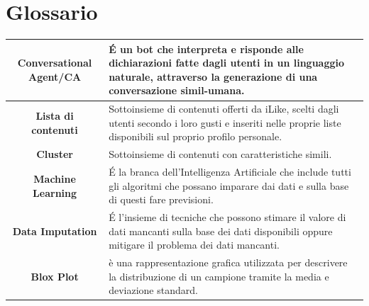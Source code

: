 \documentclass[a4paper, 10pt]{report}
\begin{document}
    \chapter{Glossario}\label{ch:glossario}
        \begin{adjustbox}{width=\columnwidth,center}
            \begin{tabular}{|>{\columncolor{Goldenrod}}c|p{8cm}|}
                \hline \textbf{Conversational Agent/CA} & É un bot che interpreta e risponde alle dichiarazioni fatte dagli utenti
                in un linguaggio naturale, attraverso la  generazione di una conversazione simil-umana.\\
                \hline \textbf{Lista di contenuti} & Sottoinsieme di contenuti offerti da iLike, scelti dagli utenti secondo i loro gusti
                e inseriti nelle proprie liste disponibili sul proprio profilo personale.\\
                \hline \textbf{Cluster} & Sottoinsieme di contenuti con caratteristiche simili.\\
                \hline \textbf{Machine Learning} & É la branca dell'Intelligenza Artificiale che include tutti gli algoritmi
                che possano imparare dai dati e sulla base di questi fare previsioni.\\
                \hline \textbf{Data Imputation} & É l'insieme di tecniche che possono stimare il valore di dati mancanti
                sulla base dei dati disponibili oppure mitigare il problema dei dati mancanti.\\
                \hline \textbf{Blox Plot} & è una rappresentazione grafica utilizzata per descrivere la distribuzione di un campione
                tramite la media e deviazione standard.\\
                \hline
            \end{tabular}
        \end{adjustbox}
\end{document}
